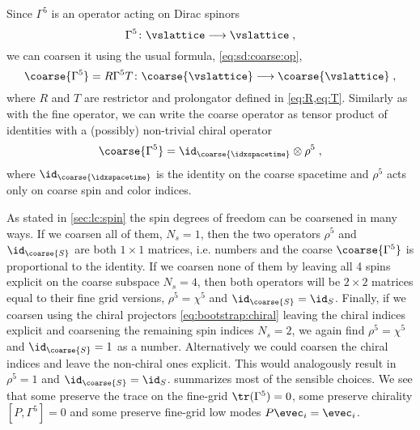 Since $\Gamma^5$ is an operator acting on Dirac spinors
\begin{equation}
\Gamma^5 \colon \vslattice \longrightarrow \vslattice \;,
\end{equation}
we can coarsen it using the usual formula, \cref{eq:sd:coarse:op},
\begin{equation}
\coarse{\Gamma^5} = R \Gamma^5 T \colon \coarse{\vslattice} \longrightarrow \coarse{\vslattice} \;,
\end{equation}
where $R$ and $T$ are restrictor and prolongator defined in \cref{eq:R,eq:T}.
Similarly as with the fine operator, we can write the coarse operator as tensor product of identities with a (possibly) non-trivial chiral operator
\begin{equation}
\coarse{\Gamma^5} = \id_{\coarse{\idxspacetime}} \otimes \rho^5 \;,
\end{equation}
where $\id_{\coarse{\idxspacetime}}$ is the identity on the coarse spacetime and $\rho^{5}$ acts only on coarse spin and color indices.

As stated in \cref{sec:lc:spin} the spin degrees of freedom can be coarsened in many ways.
If we coarsen all of them, $N_s = 1$, then the two operators $\rho^{5}$ and $\id_{\coarse{S}}$ are both $1 \times 1$ matrices, i.e. numbers and the coarse $\coarse{\Gamma^5}$ is proportional to the identity.
If we coarsen none of them by leaving all \num{4} spins explicit on the coarse subspace $N_s = 4$, then both operators will be $2 \times 2$ matrices equal to their fine grid versions, $\rho^{5} = \chi^{5}$ and $\id_{\coarse{S}} = \id_S$.
Finally, if we coarsen using the chiral projectors \cref{eq:bootstrap:chiral} leaving the chiral indices explicit and coarsening the remaining spin indices $N_s=2$, we again find $\rho^{5} = \chi^{5}$ and $\id_{\coarse{S}} = 1$ as a number.
Alternatively we could coarsen the chiral indices and leave the non-chiral ones explicit.
This would analogously result in $\rho^{5} = 1$ and $\id_{\coarse{S}} = \id_S$.
 summarizes most of the sensible choices.
We see that some preserve the trace on the fine-grid $\tr(\Gamma^{5})=0$, some preserve chirality $[P, \Gamma^{5}] = 0$ and some preserve fine-grid low modes $P \evec_i = \evec_i$.


